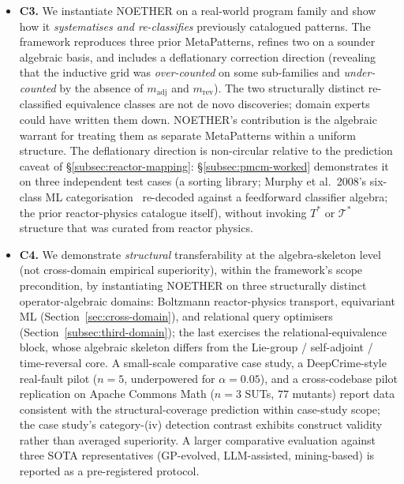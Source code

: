 \documentclass[acmsmall, screen]{acmart}
\begin{document}
\begin{itemize}
  \item \textbf{C3.} We instantiate NOETHER on a real-world program family and show how it \emph{systematises and re-classifies} previously catalogued patterns. The framework reproduces three prior MetaPatterns, refines two on a sounder algebraic basis, and includes a deflationary correction direction (revealing that the inductive grid was \emph{over-counted} on some sub-families and \emph{under-counted} by the absence of $m_{\mathrm{adj}}$ and $m_{\mathrm{rev}}$). The two structurally distinct re-classified equivalence classes are not de novo discoveries; domain experts could have written them down. NOETHER's contribution is the algebraic warrant for treating them as separate MetaPatterns within a uniform structure. The deflationary direction is non-circular relative to the prediction caveat of \S\ref{subsec:reactor-mapping}: \S\ref{subsec:pmcm-worked} demonstrates it on three independent test cases (a sorting library; Murphy et al.\ 2008's six-class ML categorisation~\cite{Murphy2008} re-decoded against a feedforward classifier algebra; the prior reactor-physics catalogue itself), without invoking $T^{*}$ or $\mathcal{T}^{*}$ structure that was curated from reactor physics.
  \item \textbf{C4.} We demonstrate \emph{structural} transferability at the algebra-skeleton level (not cross-domain empirical superiority), within the framework's scope precondition, by instantiating NOETHER on three structurally distinct operator-algebraic domains: Boltzmann reactor-physics transport, equivariant ML (Section~\ref{sec:cross-domain}), and relational query optimisers (Section~\ref{subsec:third-domain}); the last exercises the relational-equivalence block, whose algebraic skeleton differs from the Lie-group / self-adjoint / time-reversal core. A small-scale comparative case study, a DeepCrime-style real-fault pilot ($n=5$, underpowered for $\alpha=0.05$), and a cross-codebase pilot replication on Apache Commons Math ($n=3$ SUTs, $77$ mutants) report data consistent with the structural-coverage prediction within case-study scope; the case study's category-(iv) detection contrast exhibits construct validity rather than averaged superiority. A larger comparative evaluation against three SOTA representatives (GP-evolved, LLM-assisted, mining-based) is reported as a pre-registered protocol.
\end{itemize}
\end{document}
